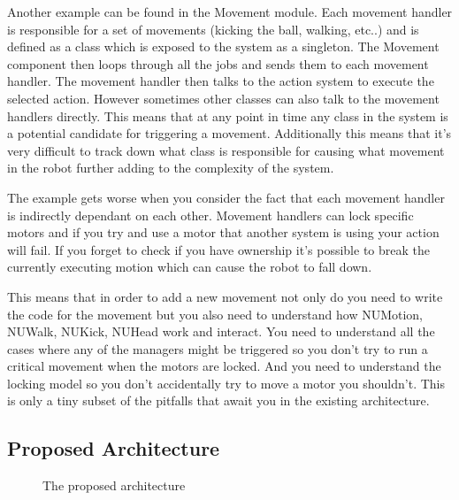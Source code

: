 \documentclass[english,12pt]{scrartcl}
\begin{document}
			Another example can be found in the Movement module.
			Each movement handler is responsible for a set of movements (kicking the ball, walking,
			etc..) and is defined as a class which is exposed to the system as a singleton. The
			Movement component then loops through all the jobs and sends them to each movement
			handler. The movement handler then talks to the action system to execute the selected
			action. However sometimes other classes can also talk to the movement handlers directly.
			This means that at any point in time any class in the system is a potential candidate
			for triggering a movement. Additionally this means that it's very difficult to track
			down what class is responsible for causing what movement in the robot further adding to
			the complexity of the system.

			The example gets worse when you consider the fact that each movement handler is
			indirectly dependant on each other. Movement handlers can lock specific motors and if
			you try and use a motor that another system is using your action will fail. If you
			forget to check if you have ownership it's possible to break the currently executing
			motion which can cause the robot to fall down.

			This means that in order to add a new movement not only do you need to write the code for the movement
			but you also need to understand how NUMotion, NUWalk, NUKick, NUHead work and interact.
			You need to understand all the cases where any of the managers might be triggered so you
			don't try to run a critical movement when the motors are locked. And you need to
			understand the locking model so you don't accidentally try to move a motor you
			shouldn't. This is only a tiny subset of the pitfalls that await you in the existing
			architecture.


		\subsection{Proposed Architecture}
			\begin{figure}[h]
				\centering
				\caption {The proposed architecture}
				\label{fig:HighLevelProposedArchitecture}
			\end{figure}
\end{document}
